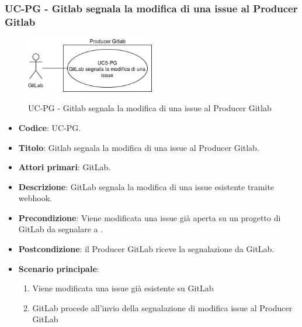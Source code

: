 	\subsubsection{UC\theuccount-PG - Gitlab segnala la modifica di una issue al Producer Gitlab}
	\begin{figure}[H]
		\centering
		\includegraphics[width=0.5\textwidth]{img/casi_d'uso/UC5.png}\\
		\caption{UC\theuccount-PG - Gitlab segnala la modifica di una issue al Producer Gitlab}
	\end{figure}
	\begin{itemize}
		\item \textbf{Codice}: UC\theuccount-PG.
		\item \textbf{Titolo}: Gitlab segnala la modifica di una issue al Producer Gitlab.
		\item \textbf{Attori primari}: GitLab.
		\item \textbf{Descrizione}: GitLab segnala la modifica di una issue esistente tramite webhook.
		\item \textbf{Precondizione}: Viene modificata una issue già aperta su un
		progetto di GitLab da segnalare a \progetto.
		\item \textbf{Postcondizione}: il Producer GitLab riceve la segnalazione da GitLab.
		\item \textbf{Scenario principale}: 
		\begin{enumerate}
			\item Viene modificata una issue già esistente su GitLab
			\item GitLab procede all'invio della segnalazione di modifica issue al Producer GitLab
		\end{enumerate}
		
	\end{itemize}